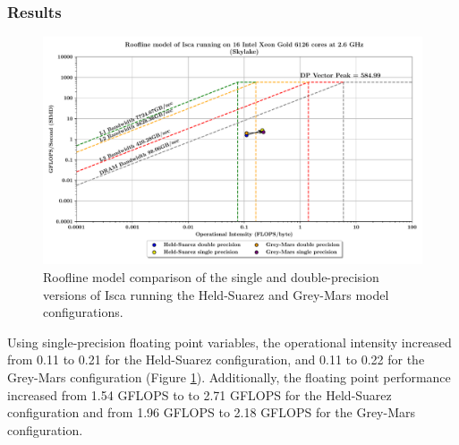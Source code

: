 \documentclass[a4paper,11pt]{report}
\begin{document}
\subsubsection{Results}
\begin{figure}[H]
\begin{center}
\includegraphics[width=\textwidth]{img/roofline_model_bluepebble_precision.pdf}
\caption[Roofline model comparison of single and double-precision arithmetic]{Roofline model comparison of the single and double-precision versions of Isca running the Held-Suarez and Grey-Mars model configurations.}
\label{fig:roofline-opt}
\end{center}
\end{figure}
Using single-precision floating point variables, the operational intensity increased from 0.11 to 0.21 for the Held-Suarez configuration, and 0.11 to 0.22 for the Grey-Mars configuration (Figure \ref{fig:roofline-opt}). Additionally, the floating point performance increased from 1.54 GFLOPS to to 2.71 GFLOPS for the Held-Suarez configuration and from 1.96 GFLOPS to 2.18 GFLOPS for the Grey-Mars configuration.
\end{document}
